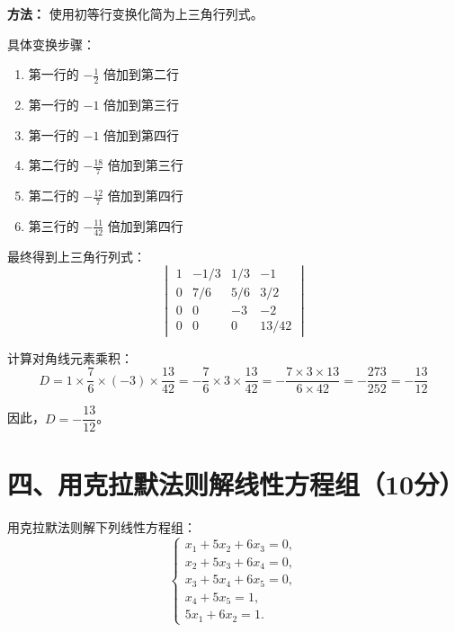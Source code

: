 \documentclass[lang=cn,12pt]{elegantbook}
\begin{document}
\begin{solution}
\textbf{方法：} 使用初等行变换化简为上三角行列式。

具体变换步骤：
\begin{enumerate}
    \item 第一行的 $-\frac{1}{2}$ 倍加到第二行
    \item 第一行的 $-1$ 倍加到第三行
    \item 第一行的 $-1$ 倍加到第四行
    \item 第二行的 $-\frac{18}{7}$ 倍加到第三行
    \item 第二行的 $-\frac{12}{7}$ 倍加到第四行
    \item 第三行的 $-\frac{11}{42}$ 倍加到第四行
\end{enumerate}

最终得到上三角行列式：
\[
\begin{vmatrix}
1 & -1/3 & 1/3 & -1 \\
0 & 7/6 & 5/6 & 3/2 \\
0 & 0 & -3 & -2 \\
0 & 0 & 0 & 13/42
\end{vmatrix}
\]

计算对角线元素乘积：
\[
D = 1 \times \frac{7}{6} \times (-3) \times \frac{13}{42}=- \frac{7}{6} \times 3 \times \frac{13}{42} = -\frac{7 \times 3 \times 13}{6 \times 42} = -\frac{273}{252} = -\frac{13}{12}
\]

因此，$D = -\dfrac{13}{12}$。
\end{solution}

\section*{四、用克拉默法则解线性方程组（10分）}

\begin{example}
用克拉默法则解下列线性方程组：
\[
\begin{cases} 
x_1 + 5x_2 + 6x_3 = 0, \\ 
x_2 + 5x_3 + 6x_4 = 0, \\ 
x_3 + 5x_4 + 6x_5 = 0, \\ 
x_4 + 5x_5 = 1, \\ 
5x_1 + 6x_2 = 1. 
\end{cases}
\]
\end{example}
\end{document}
